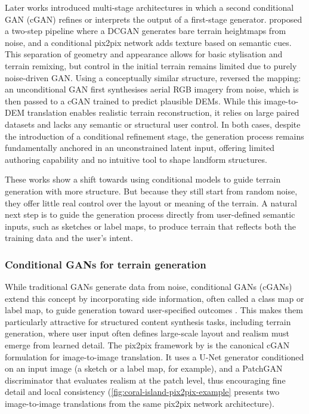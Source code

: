 Later works introduced multi-stage architectures in which a second conditional GAN (cGAN) refines or interprets the output of a first-stage generator. \cite{Beckham2017} proposed a two-step pipeline where a DCGAN generates bare terrain heightmaps from noise, and a conditional pix2pix network adds texture based on semantic cues. This separation of geometry and appearance allows for basic stylisation and terrain remixing, but control in the initial terrain remains limited due to purely noise-driven GAN. Using a conceptually similar structure, \cite{Panagiotou2020} reversed the mapping: an unconditional GAN first synthesises aerial RGB imagery from noise, which is then passed to a cGAN trained to predict plausible DEMs. While this image-to-DEM translation enables realistic terrain reconstruction, it relies on large paired datasets and lacks any semantic or structural user control. In both cases, despite the introduction of a conditional refinement stage, the generation process remains fundamentally anchored in an unconstrained latent input, offering limited authoring capability and no intuitive tool to shape landform structures.

These works show a shift towards using conditional models to guide terrain generation with more structure. But because they still start from random noise, they offer little real control over the layout or meaning of the terrain. A natural next step is to guide the generation process directly from user-defined semantic inputs, such as sketches or label maps, to produce terrain that reflects both the training data and the user's intent.


\subsubsection{Conditional GANs for terrain generation}
\label{sec:coral-island-sota-cGAN}

While traditional GANs generate data from noise, conditional GANs (cGANs) extend this concept by incorporating side information, often called a class map or label map, to guide generation toward user-specified outcomes \cite{Mirza2014}. This makes them particularly attractive for structured content synthesis tasks, including terrain generation, where user input often defines large-scale layout and realism must emerge from learned detail. The pix2pix framework by \cite{Isola2017} is the canonical cGAN formulation for image-to-image translation. It uses a U-Net generator conditioned on an input image (a sketch or a label map, for example), and a PatchGAN discriminator that evaluates realism at the patch level, thus encouraging fine detail and local consistency (\cref{fig:coral-island-pix2pix-example} presents two image-to-image translations from the same pix2pix network architecture).

